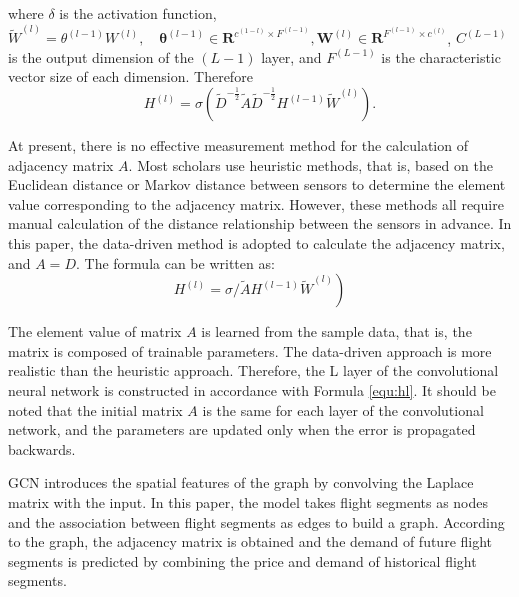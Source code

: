 \documentclass[journal,article,submit,moreauthors,pdftex]{Definitions/mdpi}
\begin{document}
where $\delta$ is the activation function, $\widetilde{W}^{(l)}=\theta^{(l-1)} W^{(l)}, \quad \boldsymbol{\theta}^{(l-1)} \in \boldsymbol{R}^{c^{(1-l)} \times F^{(l-1)}}, \boldsymbol{W}^{(l)} \in \boldsymbol{R}^{F^{(l-1)} \times c^{(l)}}$,  $C^{(L-1)}$ is the output dimension of the $(L-1)$ layer, and $F^{(L-1)}$ is the characteristic vector size of each dimension. Therefore
\begin{equation}
    H^{(l)}=\sigma\left(\widetilde{D}^{-\frac{1}{2}} \widetilde{A} \widetilde{D}^{-\frac{1}{2}} H^{(l-1)} \widetilde{W}^{(l)}\right).
\end{equation}
\par At present, there is no effective measurement method for the calculation of adjacency matrix $A$. Most scholars use heuristic methods, that is, based on the Euclidean distance or Markov distance between sensors to determine the element value corresponding to the adjacency matrix. However, these methods all require manual calculation of the distance relationship between the sensors in advance. In this paper, the data-driven method is adopted to calculate the adjacency matrix, and $A = D$. The formula can be written as:
\begin{equation}
    \left.H^{(l)}=\sigma / \widetilde{A} H^{(l-1)} \widetilde{W}^{(l)}\right)
    \label{equ:hl}
\end{equation}
\par The element value of matrix $A$ is learned from the sample data, that is, the matrix is composed of trainable parameters. The data-driven approach is more realistic than the heuristic approach. Therefore, the L layer of the convolutional neural network is constructed in accordance with Formula \ref{equ:hl}. It should be noted that the initial matrix $A$ is the same for each layer of the convolutional network, and the parameters are updated only when the error is propagated backwards.
\par GCN introduces the spatial features of the graph by convolving the Laplace matrix with the input. In this paper, the model takes flight segments as nodes and the association between flight segments as edges to build a graph. According to the graph, the adjacency matrix is obtained and the demand of future flight segments is predicted by combining the price and demand of historical flight segments.
\end{document}
